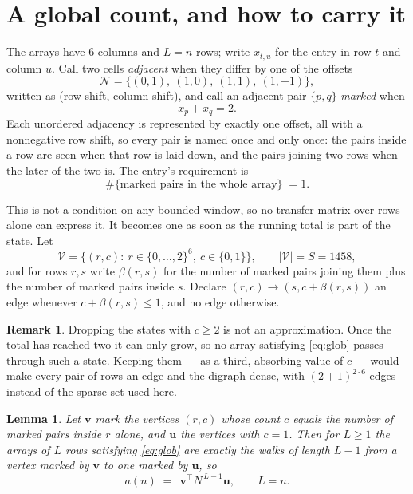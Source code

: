 \documentclass[11pt,a4paper]{article}
\theoremstyle{plain}
\newtheorem{lemma}[theorem]{Lemma}
\theoremstyle{definition}
\newtheorem{remark}[theorem]{Remark}
\begin{document}
\section{A global count, and how to carry it}

The arrays have $6$ columns and $L=n$ rows; write $x_{t,u}$ for the entry in
row $t$ and column $u$. Call two cells \emph{adjacent} when they differ by one of the
offsets
\[
\mathcal N=\{(0,1),\ (1,0),\ (1,1),\ (1,-1)\},
\]
written as (row shift, column shift), and call an adjacent pair $\{p,q\}$
\emph{marked} when
\[
x_{p}+x_{q}=2 .
\]
Each unordered adjacency is represented by exactly one offset, all with a nonnegative row
shift, so every pair is named once and only once: the pairs inside a row are seen when
that row is laid down, and the pairs joining two rows when the later of the two is. The
entry's requirement is
\begin{equation}\label{eq:glob}
\#\{\text{marked pairs in the whole array}\}\;=1.
\end{equation}

This is not a condition on any bounded window, so no transfer matrix over rows alone can
express it. It becomes one as soon as the running total is part of the state. Let
\[
\mathcal V=\bigl\{(r,c):\ r\in\{0,\dots,2\}^{6},\ c\in\{0,1\}\bigr\},
\qquad |\mathcal V|=S=1458,
\]
and for rows $r,s$ write $\beta(r,s)$ for the number of marked pairs joining them plus the
number of marked pairs inside $s$. Declare $(r,c)\to(s,c+\beta(r,s))$ an edge whenever
$c+\beta(r,s)\le1$, and no edge otherwise.

\begin{remark}
Dropping the states with $c\ge2$ is not an approximation. Once the total has reached two it
can only grow, so no array satisfying \eqref{eq:glob} passes through such a state. Keeping
them --- as a third, absorbing value of $c$ --- would make every pair of rows an edge and
the digraph dense, with $(2+1)^{2\cdot6}$ edges instead of the sparse set used here.
\end{remark}

\begin{lemma}\label{lem:walk}
Let $\mathbf{v}$ mark the vertices $(r,c)$ whose count $c$ equals the number of marked pairs
inside $r$ alone, and $\mathbf{u}$ the vertices with $c=1$. Then for $L\ge1$ the arrays
of $L$ rows satisfying \eqref{eq:glob} are exactly the walks of length $L-1$ from a
vertex marked by $\mathbf{v}$ to one marked by $\mathbf{u}$, so
\[
a(n)\;=\;\,\mathbf{v}^{\!\top}N^{\,L-1}\mathbf{u},\qquad L=n .
\]
\end{lemma}
\end{document}
